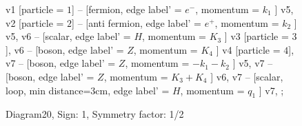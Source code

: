 \documentclass{revtex4}
\begin{document}
\begin{figure}[!htb]
\begin{center}
{    %
v1 [particle = \(1\)] -- [fermion, edge label' = \(e^{-}\), momentum = \(k_{1}\) ] v5, 
v2 [particle = \(2\)] -- [anti fermion, edge label' = \(e^{+}\), momentum = \(k_{2}\) ] v5, 
v6 -- [scalar, edge label' = \(H\), momentum = \(K_{3}\) ] v3 [particle = \(3\)], 
v6 -- [boson, edge label' = \(Z\), momentum = \(K_{4}\) ] v4 [particle = \(4\)], 
v7 -- [boson, edge label' = \(Z\), momentum = \(-k_{1} - k_{2}\) ] v5, 
v7 -- [boson, edge label' = \(Z\), momentum = \(K_{3} + K_{4}\) ] v6, 
v7 -- [scalar, loop, min distance=3cm, edge label' = \(H\), momentum = \(q_{1}\) ] v7, 
};
\end{center}
\caption{Diagram20, Sign: 1, Symmetry factor: 1/2}
\end{figure}
\newpage
\end{document}
